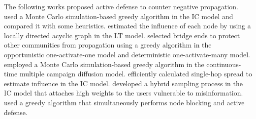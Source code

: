 The following works proposed active defense to counter negative propagation.
\citet{budak2011limiting} used a Monte Carlo simulation-based greedy algorithm in the IC model and compared it with some heuristics.
\citet{he2012influence} estimated the influence of each node by using a locally directed acyclic graph in the LT model.
\citet{fan2013least} selected bridge ends to protect other communities from propagation using a greedy algorithm in the opportunistic one-activate-one model and deterministic one-activate-many model.
\citet{luo2014time} employed a Monte Carlo simulation-based greedy algorithm in the continuous-time multiple campaign diffusion model.
\citet{zhu2016minimum} efficiently calculated single-hop spread to estimate influence in the IC model.
\citet{tong2019beyond} developed a hybrid sampling process in the IC model that attaches high weights to the users vulnerable to misinformation.
\citet{hosni2019darim} used a greedy algorithm that simultaneously performs node blocking and active defense.





